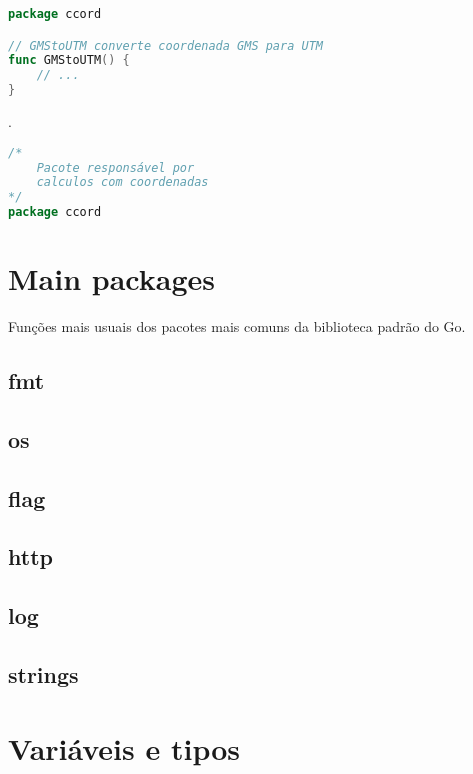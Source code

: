 \documentclass{apostila}
\begin{document}
\begin{lstlisting}[language=go,caption={Documentando pacote, variaveis, funcoes e tipos}]
package ccord

// GMStoUTM converte coordenada GMS para UTM
func GMStoUTM() {
	// ...
}
\end{lstlisting}

.

\begin{lstlisting}[language=go,caption=Documentando pacotes]
/*
    Pacote responsável por
    calculos com coordenadas
*/
package ccord
\end{lstlisting}













\chapter{Main packages}
\label{main lib}
Funções mais usuais dos pacotes mais comuns da biblioteca padrão do Go.
\section{fmt}
\section{os}
\section{flag}
\section{http}
\section{log}
\section{strings}

\chapter{Variáveis e tipos}
\end{document}
